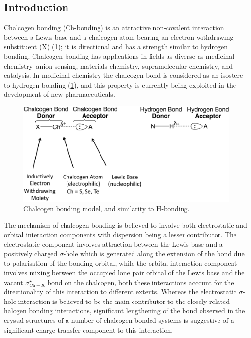 \begin{refsection}
    \section{Introduction}
    Chalcogen bonding (Ch-bonding) is an attractive non-covalent interaction between a Lewis base and a chalcogen atom bearing an electron withdrawing substituent (X) (\cref{fig:ch-bonding});\autocite{Vogel2019,Bleiholder2006,Garrett2015a} it is directional and has a strength similar to hydrogen bonding.
    Chalcogen bonding has applications in fields as diverse as medicinal chemistry,\autocite{Beno2015,Clark2007,Hudson2016,Iwaoka2002,Reid2014} anion sensing,\autocite{Lim2017,Garrett2016,Borissov2019} materials chemistry,\autocite{Biot2018} supramolecular chemistry,\autocite{Chen2018,Ho2016,Gleiter2018,Bleiholder2006,Huynh2017,Gleiter2003} and catalysis.\autocite{Wang2020}
    In medicinal chemistry the chalcogen bond is considered as an isostere to  hydrogen bonding (\cref{fig:ch-bonding}), and this property is currently being exploited in the development of new pharmaceuticals.
    
    \begin{figure}
        \centering
        \includegraphics[width=0.8\linewidth]{Figures/ch-bonding.pdf}
        \caption{Chalcogen bonding model, and similarity to H-bonding.}\label{fig:ch-bonding}
    \end{figure}
    
    The mechanism of chalcogen bonding is believed to involve both electrostatic and orbital interaction components with dispersion being a lesser contributor.
    The electrostatic component involves attraction between the Lewis base and a positively charged $\sigma$-hole which is generated along the extension of the  bond due to polarisation of the bonding orbital, while the orbital  interaction component involves mixing between the occupied lone pair orbital of the Lewis base and the vacant $\sigma^{\star}_{\mathrm{Ch-X}}$ bond on the chalcogen, both these interactions account for the directionality of this interaction to different extents.
    Whereas the electrostatic $\sigma$-hole interaction is believed to be the main contributor to the closely related halogen bonding interactions,\autocite{Prasang2009,Sarwar2010,Beale2013,Aakeroy2013,Goud2016,Stone2013} significant lengthening of the  bond observed in the crystal structures of a number of chalcogen bonded systems is suggestive of a significant charge-transfer component to this interaction.\autocite{Fellowes2019,Pascoe2017}
    

\end{refsection}
